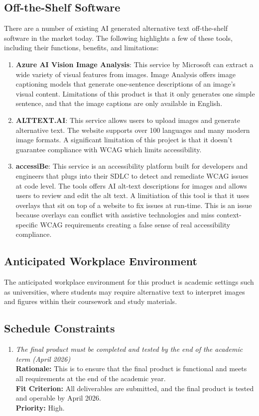 \documentclass[12pt]{article}
\begin{document}
\subsection{Off-the-Shelf Software}
There are a number of existing AI generated alternative text
off-the-shelf software in the market today. The following
highlights a few of these tools, including their functions, benefits,
and limitations:
\begin{enumerate}
  \item \textbf{Azure AI Vision Image Analysis}: This service by
    Microsoft can extract a wide variety of
    visual features from images. Image Analysis offers image
    captioning models that generate one-sentence descriptions of an
    image's visual content.
    Limitations of this product is that it only generates one simple
    sentence, and that the image
    captions are only available in English.
  \item \textbf{ALTTEXT.AI}: This service allows users to upload
    images and generate alternative text. The website supports
    over 100 languages and many modern image formats. A significant
    limitation of this project
    is that it doesn't guarantee compliance with WCAG which limits
    accessibility.
  \item \textbf{accessiBe}: This service is an accessibility platform
    built for developers and engineers that plugs into their SDLC to detect and
    remediate WCAG issues at code level. The tools offers AI alt-text
    descriptions for images and allows users to review
    and edit the alt text. A limitiation of this tool is that it uses
    overlays that sit on top of a website to fix issues at run-time.
    This is an issue
    because overlays can conflict with assistive technologies and
    miss context-specific WCAG requirements creating a false sense of
    real accessibility compliance.
\end{enumerate}
\subsection{Anticipated Workplace Environment}
The anticipated workplace environment for this product is academic
settings such as universities, where students may
require alternative text to interpret images and figures within their
coursework and study materials.
\subsection{Schedule Constraints}
\begin{enumerate}[label=MD-SC \arabic*., wide=0pt, leftmargin=*]
  \item \emph{The final product must be completed and tested by the
    end of the academic term (April 2026)}\\[2mm]
    {\bf Rationale:} This is to ensure that the final product is
    functional and meets all requirements
    at the end of the academic year.\\
    {\bf Fit Criterion:} All deliverables are submitted, and the
    final product is tested and operable by April 2026. \\
    {\bf Priority:} High.
\end{enumerate}
\end{document}
